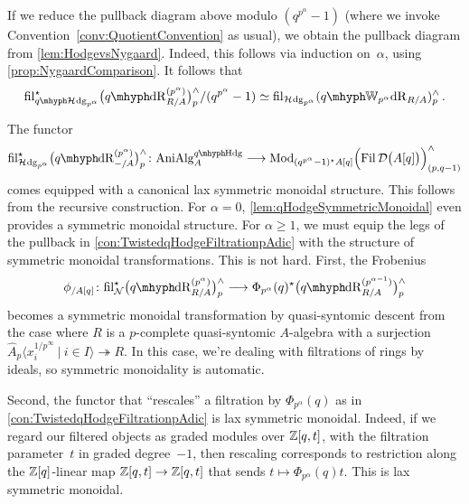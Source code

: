 \documentclass[DIV=12,numbers=enddot,leqno,bibliography=totoc]{scrartcl}
\begin{document}
	\begin{rem}\label{rem:PullbackModqpa-1}
		If we reduce the pullback diagram above modulo $(q^{p^\alpha}-1)$ (where we invoke Convention~\cref{conv:QuotientConvention} as usual), we obtain the pullback diagram from \cref{lem:HodgevsNygaard}. Indeed, this follows via induction on~$\alpha$, using \cref{prop:NygaardComparison}. It follows that 
		\begin{equation*}
			\fil_{\qHhodge_{p^\alpha}}^\star \bigl(\qdeRham_{R/A}^{(p^\alpha)}\bigr)_p^\complete/(q^{p^\alpha}-1)\simeq  \fil_{\Hhodge_{p^\alpha}}(\qIW_{p^\alpha}\deRham_{R/A})_p^\complete\,.
		\end{equation*}
	\end{rem}
	\begin{numpar}\label{par:TwistedqHodgeLaxSymmetricMonoidalI}
		The functor
		\begin{equation*}
			\fil_{\Hhodge_{p^\alpha}}^\star \bigl(\qdeRham_{-/A}^{(p^\alpha)}\bigr)_p^\complete\colon \cat{AniAlg}_A^{\qHodge}\longrightarrow  \Mod_{(q^{p^\alpha}-1)^\star A[q]}\Bigl(\Fil \Dd\bigl(A[q]\bigr)\Bigr)_{(p,q-1)}^\complete
		\end{equation*}
		comes equipped with a canonical lax symmetric monoidal structure. This follows from the recursive construction. For $\alpha=0$, \cref{lem:qHodgeSymmetricMonoidal} even provides a symmetric monoidal structure. For $\alpha\geqslant 1$, we must equip the legs of the pullback in \cref{con:TwistedqHodgeFiltrationpAdic} with the structure of symmetric monoidal transformations. This is not hard. First, the Frobenius
		\begin{equation*}
			\phi_{/A[q]}\colon  \fil_\Nn^\star \bigl(\qdeRham_{R/A}^{(p^\alpha)}\bigr)_p^\complete\longrightarrow \Phi_{p^\alpha}(q)^\star \bigl(\qdeRham_{R/A}^{(p^{\alpha-1})}\bigr)_p^\complete
		\end{equation*}
		becomes a symmetric monoidal transformation by quasi-syntomic descent from the case where $R$ is a $p$-complete quasi-syntomic $A$-algebra with a surjection $\widehat{A}_p\langle x_i^{1/p^\infty}\ |\ i\in I\rangle \twoheadrightarrow R$. In this case, we're dealing with filtrations of rings by ideals, so symmetric monoidality is automatic.
		
		Second, the functor that \enquote{rescales} a filtration by $\Phi_{p^\alpha}(q)$ as in \cref{con:TwistedqHodgeFiltrationpAdic} is lax symmetric monoidal. Indeed, if we regard our filtered objects as graded modules over $\mathbb{Z}[q,t]$, with the filtration parameter~$t$ in graded degree~$-1$, then rescaling corresponds to restriction along the $\mathbb{Z}[q]$-linear map $\mathbb{Z}[q,t]\rightarrow \mathbb{Z}[q,t]$ that sends $t\mapsto \Phi_{p^\alpha}(q)t$. This is lax symmetric monoidal.
	\end{numpar}
\end{document}
